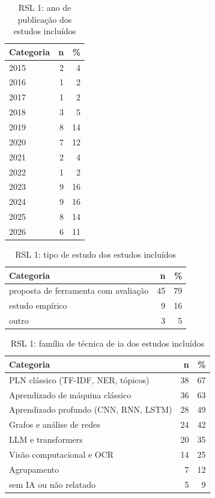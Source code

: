 \begin{table}[htbp]
\centering
\caption{RSL 1: ano de publicação dos estudos incluídos}
\label{tab:map-rsl1-anodepublica}
\small
\begin{tabular}{p{8cm}rr}
\hline
\textbf{Categoria} & \textbf{n} & \textbf{\%} \\
\hline
2015 & 2 & 4 \\
2016 & 1 & 2 \\
2017 & 1 & 2 \\
2018 & 3 & 5 \\
2019 & 8 & 14 \\
2020 & 7 & 12 \\
2021 & 2 & 4 \\
2022 & 1 & 2 \\
2023 & 9 & 16 \\
2024 & 9 & 16 \\
2025 & 8 & 14 \\
2026 & 6 & 11 \\
\hline
\end{tabular}
\end{table}
\begin{table}[htbp]
\centering
\caption{RSL 1: tipo de estudo dos estudos incluídos}
\label{tab:map-rsl1-tipodeestudo}
\small
\begin{tabular}{p{8cm}rr}
\hline
\textbf{Categoria} & \textbf{n} & \textbf{\%} \\
\hline
proposta de ferramenta com avaliação & 45 & 79 \\
estudo empírico & 9 & 16 \\
outro & 3 & 5 \\
\hline
\end{tabular}
\end{table}
\begin{table}[htbp]
\centering
\caption{RSL 1: família de técnica de ia dos estudos incluídos}
\label{tab:map-rsl1-famliadetcni}
\small
\begin{tabular}{p{8cm}rr}
\hline
\textbf{Categoria} & \textbf{n} & \textbf{\%} \\
\hline
PLN clássico (TF-IDF, NER, tópicos) & 38 & 67 \\
Aprendizado de máquina clássico & 36 & 63 \\
Aprendizado profundo (CNN, RNN, LSTM) & 28 & 49 \\
Grafos e análise de redes & 24 & 42 \\
LLM e transformers & 20 & 35 \\
Visão computacional e OCR & 14 & 25 \\
Agrupamento & 7 & 12 \\
sem IA ou não relatado & 5 & 9 \\
\hline
\end{tabular}
\end{table}
